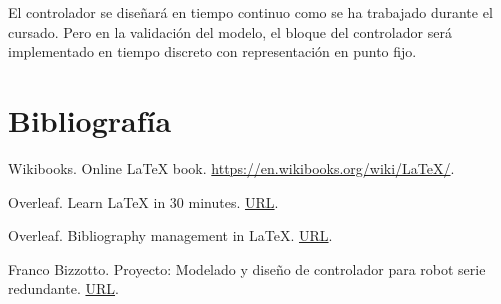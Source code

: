 \documentclass{article}
\begin{document}
El controlador se diseñará en tiempo continuo como se ha trabajado durante el cursado. Pero en la validación del modelo, el bloque del controlador será implementado en tiempo discreto con representación en punto fijo.


\section*{Bibliografía}

Wikibooks. Online \LaTeX{} book. \href{https://en.wikibooks.org/wiki/LaTeX/}{https://en.wikibooks.org/wiki/LaTeX/}.

Overleaf. Learn LaTeX in 30 minutes. \href{https://www.overleaf.com/learn/latex/Learn_LaTeX_in_30_minutes}{URL}.

Overleaf. Bibliography management in LaTeX. \href{https://www.overleaf.com/learn/latex/Bibliography_management_in_LaTeX}{URL}.

Franco Bizzotto. Proyecto: Modelado y diseño de controlador para robot serie redundante. \href{https://github.com/carloshernangarrido/control/blob/master/12_anteproyecto_proyecto-final/Bizzotto_Robot-serie.pdf}{URL}.




\end{document}
